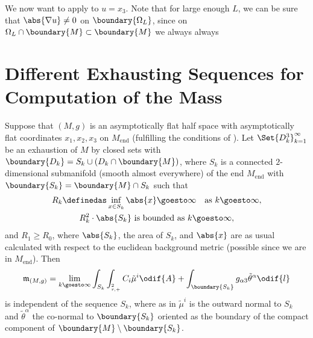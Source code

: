 \documentclass[titlepage,numbers=noenddot,headinclude,oneside,%
footinclude=true,cleardoublepage=empty,%
BCOR=5mm,paper=a4,fontsize=11pt,%
english,%
]{scrartcl}
\let\sphere\relax
\newcommand{\sphere}{\mathbb{S}}
\newcommand{\Mend}{M_{\mathrm{end}}} %
\newcommand{\mass}[2]{\mathfrak{m}_{(#1,#2)}} %
\begin{document}
We now want to apply  to \( u=x_3 \). Note that for large enough \( L \), we can be sure that \( \abs{\nabla u}\neq 0 \) on \( \boundary{\Omega_L} \), since on \( \Omega_L\cap \boundary{M}\subset\boundary{M} \) we always always     

\newpage
\appendix
\section{Different Exhausting Sequences for Computation of the Mass}
\begin{proposition}\label{prop:mass_independent_of_exhausting_sequence}
    Suppose that \( (M,g) \) is an asymptotically flat half space with asymptotically flat coordinates \( x_1,x_2,x_3 \) on \( \Mend \) (fulfilling the conditions of ). Let \( \Set{D_k^3}_{k=1}^{\infty} \) be an exhaustion of \( M \) by closed sets with \( \boundary{D_k}=S_k\cup (D_k\cap \boundary{M}) \), where \( S_k \) is a connected \( 2 \)-dimensional submanifold (smooth almost everywhere) of the end \( \Mend \) with \( \boundary{S_k}=\boundary{M}\cap S_k \) such that
    \begin{gather*}
        R_k\definedas \inf_{x\in S_k} \abs{x}\goesto \infty\quad \text{as \( k\goesto \infty \)},\\
        R_k^2\cdot \abs{S_k} \text{ is bounded as \( k\goesto \infty \)},
    \end{gather*}
    and \( R_1\geq R_0 \), where \( \abs{S_k} \), the area of \( S_k \), and \( \abs{x} \) are as usual calculated with respect to the euclidean background metric (possible since we are in \( \Mend \)). Then
    \begin{equation*}
        \mass{M}{g}=\lim_{k \goesto \infty}\int_{S_k}\int_{\sphere_{r,+}^{2}}C_i\tilde{\mu}^i\odif{A}+\int_{\boundary{S_k}}g_{\alpha 3}\tilde{\theta}^\alpha\odif{l}
    \end{equation*}
    is independent of the sequence \( S_k \), where as in  \( \tilde{\mu}^i \) is the outward normal to \( S_k \) and \( \tilde{\theta}^\alpha \) the co-normal to \( \boundary{S_k} \) oriented as the boundary of the compact component of \( \boundary{M}\setminus \boundary{S_k} \).
\end{proposition}
\end{document}
